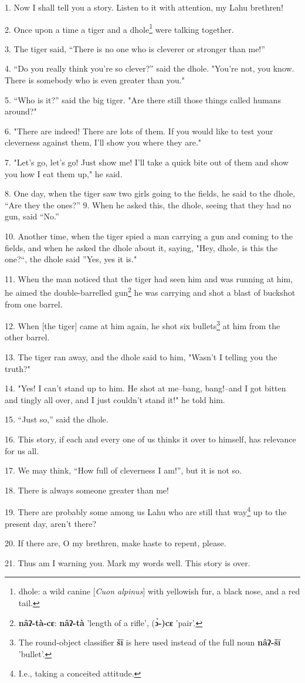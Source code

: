 \setcounter{footnote}{0}


1. Now I shall tell you a story. Listen to it with attention, my Lahu brethren!

2. Once upon a time a tiger and a dhole\footnote{dhole: a wild canine [\textit{Cuon alpinus}] with yellowish fur, a black nose, and a red tail.} were talking together.

3. The tiger said, ``There is no one who is cleverer or stronger than me!''

4. ``Do you really think you're so clever?'' said the dhole. "You're
not, you know. There is somebody who is even greater than you."

5. ``Who is it?'' said the big tiger. "Are there still
those things called humans around?"

6. "There are indeed! There are lots of them. If you would like to test
your cleverness against them, I'll show you where they are."

7. "Let's go, let's go! Just show me! I'll take a quick bite out of them
and show you how I eat them up," he said.

8. One day, when the tiger saw two girls going to the fields, he said to the dhole,
``Are they the ones?'' 9. When he asked this, the dhole, seeing
that they had no gun, said ``No.''

10. Another time, when the tiger spied a man carrying a gun and coming to the fields,
and when he asked the dhole about it, saying, "Hey, dhole, is this the
one?``, the dhole said ''Yes, yes it is."

11. When the man noticed that the tiger had seen him and was running at him, he
aimed the double-barrelled gun\footnote{\textbf{nâʔ-tà-cɛ}: \textbf{nâʔ-tà} 'length of a rifle', (\textbf{ɔ̀-)cɛ} 'pair'.} he was carrying and shot a blast of buckshot
from one barrel.

12. When [the tiger] came at him again, he shot six bullets\footnote{The round-object classifier \textbf{šī} is here used instead of the full noun \textbf{nâʔ-šī} 'bullet'.} at him from the
other barrel.

13. The tiger ran away, and the dhole said to him, "Wasn't I telling you
the truth?"

14. "Yes! I can't stand up to him. He shot at me--bang, bang!--and I got
bitten and tingly all over, and I just couldn't stand it!" he told him.

15. ``Just so,'' said the dhole.

16. This story, if each and every one of us thinks it over to himself, has relevance
for us all.

17. We may think, ``How full of cleverness I am!'', but it is not
so.

18. There is always someone greater than me!

19. There are probably some among us Lahu who are still that way\footnote{I.e., taking a conceited attitude.} up to the
present day, aren't there?

20. If there are, O my brethren, make haste to repent, please.

21. Thus am I warning you. Mark my words well. This story is over.

